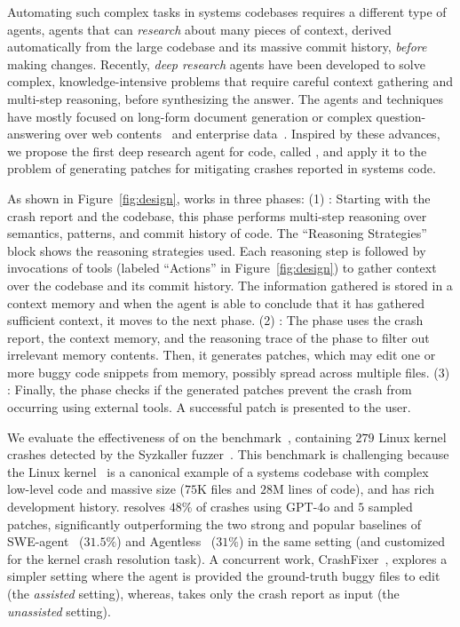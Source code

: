 Automating such complex tasks in systems codebases requires a different type of agents, agents that can \emph{research} about many pieces of context, derived automatically from the large codebase and its massive commit history, \emph{before} making changes.
Recently, \emph{deep research} agents have been developed to solve complex, knowledge-intensive problems that require careful context gathering and multi-step reasoning, before synthesizing the answer. The agents and techniques have mostly focused on long-form document generation or complex question-answering over web contents~\citep{shao2024assisting,openaidr,geminidr,perplexitydr,li2025webthinker,wu2025unfolding} and enterprise data~\citep{anthropicdr,microsoftdr}.
Inspired by these advances, we propose the first deep research agent for code, called \cresearcher{}, and apply it to the problem of generating patches for mitigating crashes reported in systems code.


As shown in Figure~\ref{fig:design}, \cresearcher{} works in three phases:
(1) \analysisphase: Starting with the crash report and the codebase, this phase performs multi-step reasoning over semantics, patterns, and commit history of code. The ``Reasoning Strategies'' block shows the reasoning strategies used. Each reasoning step is followed by invocations of tools (labeled ``Actions'' in Figure~\ref{fig:design}) to gather context over the codebase and its commit history. The information gathered is stored in a context memory and when the agent is able to conclude that it has gathered sufficient context, it moves to the next phase.
(2) \synthesisphase: The \synthesisphase phase uses the crash report, the context memory, and the reasoning trace of the \analysisphase{} phase to filter out irrelevant memory contents. Then, it generates patches, which may edit one or more buggy code snippets from memory, possibly spread across multiple files.
(3) \validationphase: Finally, the \validationphase phase checks if the generated patches prevent the crash from occurring using external tools. A successful patch is presented to the user.

We evaluate the effectiveness of \cresearcher{} on the \kbenchsyz{} benchmark~\citep{kgym}, containing $279$ Linux kernel crashes detected by the Syzkaller fuzzer~\citep{syzkaller}.
This benchmark is challenging because the Linux kernel~\citep{linux} is a canonical example of a systems codebase with complex low-level code and massive size ($75$K files and $28$M lines of code), and has rich development history.
\cresearcher{} resolves $48\%$ of crashes using GPT-4o and $5$ sampled patches, significantly outperforming the two strong and popular baselines of SWE-agent~\citep{yang2024sweagentagentcomputerinterfacesenable} ($31.5\%$) and Agentless~\citep{xia2024agentlessdemystifyingllmbasedsoftware} ($31\%$) in the same setting (and customized for the kernel crash resolution task).
A concurrent work, CrashFixer~\citep{crashfixer}, explores a simpler setting where the agent is provided the ground-truth buggy files to edit (the \emph{assisted} setting), whereas, \cresearcher{} takes only the crash report as input (the \emph{unassisted} setting).


